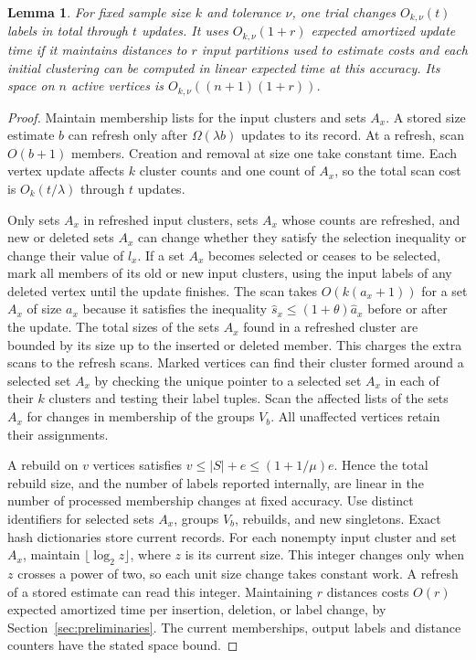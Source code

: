 \documentclass[11pt]{article}
\newtheorem{lemma}[theorem]{Lemma}
\begin{document}
\begin{lemma}\label{lem:dynamic-work}
For fixed sample size $k$ and tolerance $\nu$, one trial changes
$O_{k,\nu}(t)$ labels in total through $t$ updates. It uses
$O_{k,\nu}(1+r)$ expected amortized update time if it maintains
distances to $r$ input partitions used to estimate costs and each initial clustering can be computed in linear
expected time at this accuracy. Its space on $n$ active vertices is
$O_{k,\nu}((n+1)(1+r))$.
\end{lemma}
\begin{proof}
Maintain membership lists for the input clusters and sets $A_x$. A
stored size estimate $b$ can refresh only after $\Omega(\lambda b)$
updates to its record. At a refresh, scan $O(b+1)$ members.
Creation and removal at size one take constant time. Each vertex
update affects $k$ cluster counts and one count of $A_x$, so the total
scan cost is $O_k(t/\lambda)$ through $t$ updates.

Only sets $A_x$ in refreshed input clusters, sets $A_x$ whose counts are refreshed,
and new or deleted sets $A_x$ can change whether they satisfy the selection inequality or change their
value of $l_x$. If a set $A_x$ becomes selected or ceases to be selected, mark all members of
its old or new input clusters, using the input labels of any deleted
vertex until the update finishes. The scan takes $O(k(a_x+1))$
for a set $A_x$ of size $a_x$ because it satisfies the inequality $\widehat
s_x\le(1+\theta)\widehat a_x$ before or after
the update. The total sizes of the sets $A_x$ found in a refreshed
cluster are bounded by its size up to the inserted or deleted member.
This charges the extra scans to the refresh scans. Marked vertices
can find their cluster formed around a selected set $A_x$ by checking the unique
pointer to a selected set $A_x$ in
each of their $k$ clusters and testing their label tuples. Scan the
affected lists of the sets $A_x$ for changes in membership of the groups $V_b$. All unaffected vertices
retain their assignments.

A rebuild on $v$ vertices satisfies $v\le |S|+e\le(1+1/\mu)e$.
Hence the total rebuild size, and the number of labels reported
internally, are linear in the number of processed membership
changes at fixed accuracy. Use distinct identifiers for selected sets $A_x$,
groups $V_b$, rebuilds, and new singletons. Exact hash dictionaries store
current records. For each nonempty input cluster and set $A_x$,
maintain $\lfloor\log_2 z\rfloor$, where $z$ is its current size.
This integer changes only when $z$ crosses a power of two, so each
unit size change takes constant work. A refresh of a stored estimate
can read this integer. Maintaining $r$ distances costs $O(r)$ expected amortized
time per insertion, deletion, or label change, by
Section~\ref{sec:preliminaries}. The current memberships, output
labels and distance counters have the stated space bound.
\end{proof}
\end{document}
